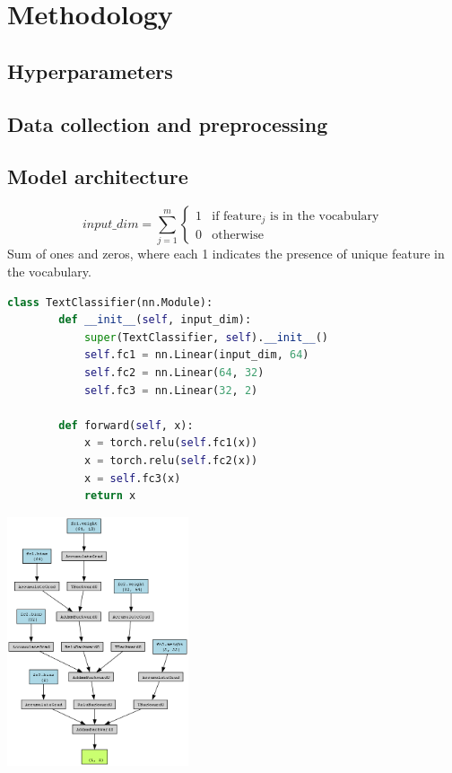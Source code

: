 ﻿\section{Methodology}

\lstset{
  basicstyle=\small\ttfamily,
  captionpos=b,
  frame=single,
  breaklines=true,
  showstringspaces=false,
  aboveskip=2.5pt,
  belowskip=2pt
}

\subsection{Hyperparameters}

\subsection{Data collection and preprocessing}

\subsection{Model architecture}
\[
    input\_dim = \sum_{j=1}^{m} \begin{cases} 1 & \text{if feature}_j \text{ is in the vocabulary} \\ 0 & \text{otherwise} \end{cases}
\]
Sum of ones and zeros, where each 1 indicates the presence of unique feature in the vocabulary.

\begin{lstlisting}[language=Python, caption={Modell Python kód tartalma}, label=modell]
    class TextClassifier(nn.Module):
        def __init__(self, input_dim):
            super(TextClassifier, self).__init__()
            self.fc1 = nn.Linear(input_dim, 64)
            self.fc2 = nn.Linear(64, 32)
            self.fc3 = nn.Linear(32, 2)

        def forward(self, x):
            x = torch.relu(self.fc1(x))
            x = torch.relu(self.fc2(x))
            x = self.fc3(x)
            return x
\end{lstlisting}
\includegraphics[width=0.4\textwidth]{text_classifier_model.png} \\

